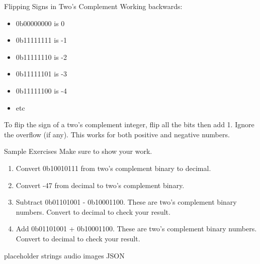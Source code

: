 \begin{frame}{Flipping Signs in Two's Complement}
Working backwards:
    \begin{itemize}
    \item 0b00000000 is 0
    \item 0b11111111 is -1
    \item 0b11111110 is -2
    \item 0b11111101 is -3
    \item 0b11111100 is -4
    \item etc
\end{itemize}

To flip the sign of a two's complement integer, flip all the bits then add 1. Ignore the overflow (if any). This works for both positive and negative numbers. 
\end{frame}

\begin{frame}{Sample Exercises}
Make sure to show your work.
\begin{enumerate}
    \item Convert 0b10010111 from two's complement binary to decimal.
    \item Convert -47 from decimal to two's complement binary. 
    \item Subtract 0b01101001 - 0b10001100. These are two's complement binary numbers. Convert to decimal to check your result.
    \item Add 0b01101001 + 0b10001100. These are two's complement binary numbers. Convert to decimal to check your result.
\end{enumerate}
\end{frame}




\begin{frame}{placeholder}
    strings
    audio
    images
    JSON
\end{frame}
    
